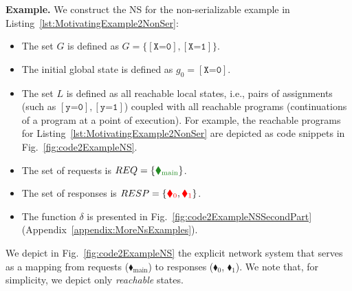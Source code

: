 %
\begin{tcolorbox}[colback=black!5!white, colframe=black, boxrule=1pt]
\textbf{Example.}
We construct the NS for the non-serializable example in Listing~\ref{lst:MotivatingExample2NonSer}:
%
\begin{itemize}
\item 
The set $G$ is defined as $G=\{[\texttt{X=0}], [\texttt{X=1}]\}$.

\item 
The initial global state is defined as $g_0 = [\texttt{X=0}]$.

\item 
The set $L$ is defined as all reachable local states, i.e., pairs of assignments (such as $[\texttt{y=0}], [\texttt{y=1}]$) coupled with all reachable \toolname{} programs (continuations of a program at a point of execution).
For example, the reachable programs for Listing~\ref{lst:MotivatingExample2NonSer} are depicted as code snippets in Fig.~\ref{fig:code2ExampleNS}. 


\item 
The set of requests is $REQ = \{{\color{ForestGreen}\blacklozenge_\text{main}}\}$.

\item 
The set of responses is $RESP = \{{\color{red}\blacklozenge_0},{\color{red}\blacklozenge_1}\}$.

\item
The function \(\delta\) is presented in Fig.~\ref{fig:code2ExampleNSSecondPart} (Appendix~\ref{appendix:MoreNsExamples}).


\end{itemize}


We depict in Fig.~\ref{fig:code2ExampleNS} the explicit network system that
serves as a mapping from requests ({\color{ForestGreen}$\blacklozenge_\text{main}$}) to responses ({\color{red}$\blacklozenge_0$}, {\color{red}$\blacklozenge_1$}).
%
We note that, for simplicity, we depict only \textit{reachable} states.
%
\end{tcolorbox}

